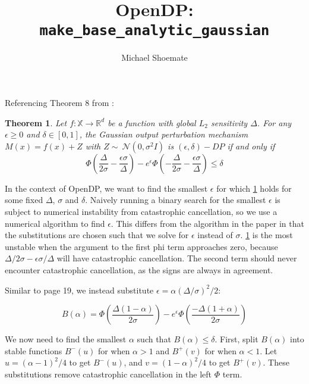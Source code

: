 \documentclass{article}
\title{OpenDP: \texttt{make\_base\_analytic\_gaussian}}
\author{Michael Shoemate}
\newtheorem{theorem}{Theorem}[section]
\theoremstyle{definition}
\begin{document}
\maketitle

Referencing Theorem 8 from \cite{Balle2018ImprovingTG}:
\begin{theorem}
    Let $f: \mathbb{X} \rightarrow \mathbb{R}^d$ be a function with global $L_2$ sensitivity $\Delta$. 
    For any $\epsilon \geq 0$ and $\delta \in [0, 1]$, 
    the Gaussian output perturbation mechanism $M(x) = f(x) + Z$ with $Z \sim \ \mathcal{N}(0, \sigma^2I)$ is $(\epsilon, \delta)-DP$ if and only if
    \begin{equation}
        \Phi \left( \frac{\Delta}{2\sigma} - \frac{\epsilon\sigma}{\Delta} \right) - e^\epsilon \Phi \left(-\frac{\Delta}{2\sigma} - \frac{\epsilon\sigma}{\Delta} \right) \leq \delta
    \end{equation}
    \label{dp-definition}
\end{theorem}

In the context of OpenDP, we want to find the smallest $\epsilon$ for which \ref{dp-definition} holds for some fixed $\Delta$, $\sigma$ and $\delta$.
Naively running a binary search for the smallest $\epsilon$ is subject to numerical instability from catastrophic cancellation, so we use a numerical algorithm to find $\epsilon$.
This differs from the algorithm in the paper in that the substitutions are chosen such that we solve for $\epsilon$ instead of $\sigma$.
\ref{dp-definition} is the most unstable when the argument to the first phi term approaches zero, because $\Delta/2\sigma - \epsilon \sigma / \Delta$ will have catastrophic cancellation. 
The second term should never encounter catastrophic cancellation, as the signs are always in agreement. 

Similar to page 19, we instead substitute $\epsilon = \alpha (\Delta / \sigma)^2 / 2$:

\begin{equation}
    B(\alpha) = \Phi\left(\frac{\Delta (1 - \alpha)}{2 \sigma}\right) - e^\epsilon \Phi\left(\frac{-\Delta (1 + \alpha)}{2 \sigma}\right)
\end{equation}

We now need to find the smallest $\alpha$ such that $B(\alpha) \leq \delta$. 
First, split $B(\alpha)$ into stable functions $B^-(u)$ for when $\alpha > 1$ and $B^+(v)$ for when $\alpha < 1$.
Let $u = (\alpha - 1)^2 / 4$ to get $B^-(u)$, and $v = (1 - \alpha)^2 / 4$ to get $B^+(v)$. 
These substitutions remove catastrophic cancellation in the left $\Phi$ term.
\end{document}

